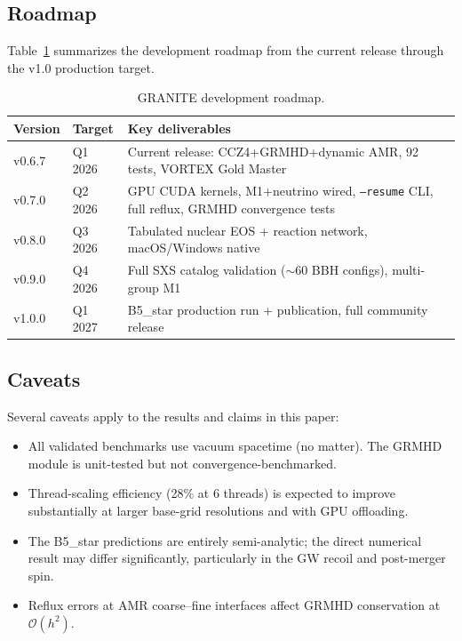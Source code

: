 \documentclass[aps,prd,twocolumn,superscriptaddress,nofootinbib,showpacs,
               longbibliography]{revtex4-2}
\newcommand{\code}[1]{\texttt{#1}}
\newcommand{\order}[1]{\mathcal{O}(#1)}
\begin{document}
\subsection{Roadmap}

Table~\ref{tab:roadmap} summarizes the development roadmap from the current
release through the v1.0 production target.

\begin{table}[t]
\caption{GRANITE development roadmap.}
\label{tab:roadmap}
\begin{ruledtabular}
\begin{tabular}{llp{4.5cm}}
  Version & Target & Key deliverables \\ \hline
  v0.6.7 & Q1 2026 & Current release: CCZ4+GRMHD+dynamic AMR, 92 tests, VORTEX Gold Master \\
  v0.7.0 & Q2 2026 & GPU CUDA kernels, M1+neutrino wired, \code{--resume} CLI, full reflux, GRMHD convergence tests \\
  v0.8.0 & Q3 2026 & Tabulated nuclear EOS + reaction network, macOS/Windows native \\
  v0.9.0 & Q4 2026 & Full SXS catalog validation (${\sim}60$ BBH configs), multi-group M1 \\
  v1.0.0 & Q1 2027 & B5\_star production run + publication, full community release \\
\end{tabular}
\end{ruledtabular}
\end{table}

\subsection{Caveats}

Several caveats apply to the results and claims in this paper:
\begin{itemize}[nosep]
  \item All validated benchmarks use vacuum spacetime (no matter).
    The GRMHD module is unit-tested but not convergence-benchmarked.
  \item Thread-scaling efficiency (28\% at 6 threads) is expected to improve
    substantially at larger base-grid resolutions and with GPU offloading.
  \item The B5\_star predictions are entirely semi-analytic; the direct
    numerical result may differ significantly, particularly in the GW
    recoil and post-merger spin.
  \item Reflux errors at AMR coarse--fine interfaces affect GRMHD
    conservation at $\order{h^2}$.
\end{itemize}
\end{document}
